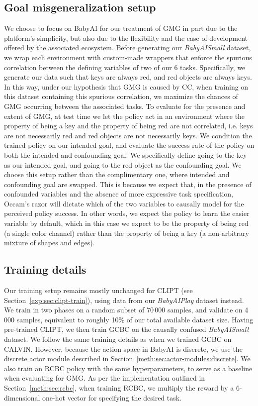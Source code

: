 \documentclass[../main.tex]{subfiles}
\begin{document}
\subsection{Goal misgeneralization setup}

We choose to focus on BabyAI for our treatment of GMG in part due to the platform's simplicity, but
also due to the flexibility and the ease of development offered by the associated ecosystem. Before
generating our \textit{BabyAISmall} dataset, we wrap each environment with custom-made wrappers that
enforce the spurious correlation between the defining variables of two of our 6 tasks. Specifically,
we generate our data such that keys are always red, and red objects are always keys. In this way,
under our hypothesis that GMG is caused by CC, when training on this dataset containing this
spurious correlation, we maximize the chances of GMG occurring between the associated tasks. To
evaluate for the presence and extent of GMG, at test time we let the policy act in an environment
where the property of being a key and the property of being red are not correlated, i.e. keys are
not necessarily red and red objects are not necessarily keys. We condition the trained policy on our
intended goal, and evaluate the success rate of the policy on both the intended and confounding
goal. We specifically define going to the key as our intended goal, and going to the red object as
the confounding goal. We choose this setup rather than the complimentary one, where intended and
confounding goal are swapped. This is because we expect that, in the presence of confounded
variables and the absence of more expressive task specification, Occam's razor will dictate
which of the two variables to causally model for the perceived policy success. In other words, we
expect the policy to learn the easier variable by default, which in this case we expect to be the property of being
red (a single color channel) rather than the property of being a key (a non-arbitrary mixture of
shapes and edges).

\subsection{Training details}

Our training setup remains mostly unchanged for CLIPT (see Section~\ref{exp:sec:clipt-train}), using
data from our \textit{BabyAIPlay} dataset instead. We train in two phases on a random subset of
70\,000 samples, and validate on 4\,000 samples, equivalent to roughly 10\% of our total available
dataset size. Having pre-trained CLIPT, we then train GCBC on the causally confused
\textit{BabyAISmall} dataset. We follow the same training details as when we trained GCBC on CALVIN.
However, because the action space in BabyAI is discrete, we use the discrete actor module described
in Section~\ref{meth:sec:actor-modules:discrete}. We also train an RCBC policy with the same
hyperparameters, to serve as a baseline when evaluating for GMG. As per the implementation outlined
in Section~\ref{meth:sec:rcbc}, when training RCBC, we multiply the reward by a 6-dimensional
one-hot vector for specifying the desired task.
\end{document}
